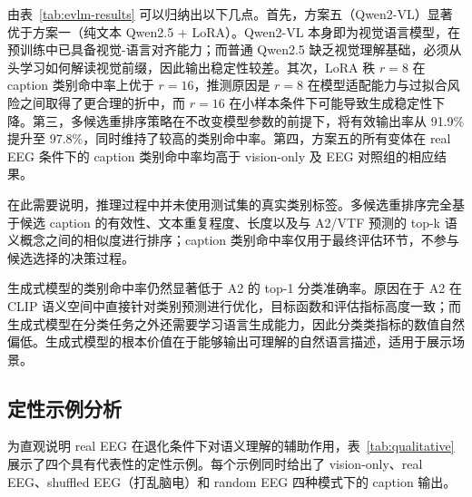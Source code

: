 由表~\ref{tab:evlm-results} 可以归纳出以下几点。首先，方案五（Qwen2-VL）显著优于方案一（纯文本 Qwen2.5 + LoRA）。Qwen2-VL 本身即为视觉语言模型，在预训练中已具备视觉-语言对齐能力；而普通 Qwen2.5 缺乏视觉理解基础，必须从头学习如何解读视觉前缀，因此输出稳定性较差。其次，LoRA 秩 $r=8$ 在 caption 类别命中率上优于 $r=16$，推测原因是 $r=8$ 在模型适配能力与过拟合风险之间取得了更合理的折中，而 $r=16$ 在小样本条件下可能导致生成稳定性下降。第三，多候选重排序策略在不改变模型参数的前提下，将有效输出率从 91.9\% 提升至 97.8\%，同时维持了较高的类别命中率。第四，方案五的所有变体在 real EEG 条件下的 caption 类别命中率均高于 vision-only 及 EEG 对照组的相应结果。

在此需要说明，推理过程中并未使用测试集的真实类别标签。多候选重排序完全基于候选 caption 的有效性、文本重复程度、长度以及与 A2/VTF 预测的 top-k 语义概念之间的相似度进行排序；caption 类别命中率仅用于最终评估环节，不参与候选选择的决策过程。

生成式模型的类别命中率仍然显著低于 A2 的 top-1 分类准确率。原因在于 A2 在 CLIP 语义空间中直接针对类别预测进行优化，目标函数和评估指标高度一致；而生成式模型在分类任务之外还需要学习语言生成能力，因此分类类指标的数值自然偏低。生成式模型的根本价值在于能够输出可理解的自然语言描述，适用于展示场景。

\subsection{定性示例分析}

为直观说明 real EEG 在退化条件下对语义理解的辅助作用，表~\ref{tab:qualitative} 展示了四个具有代表性的定性示例。每个示例同时给出了 vision-only、real EEG、shuffled EEG（打乱脑电）和 random EEG 四种模式下的 caption 输出。

